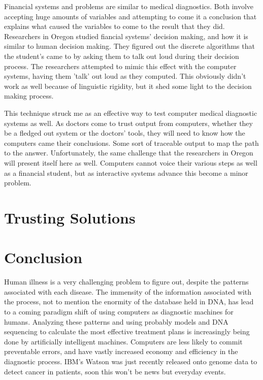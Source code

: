 \documentclass[11pt]{article}
\newcommand{\tab}{\hspace*{2em}}
\begin{document}
\begin{doublespace}
\tab Financial systems and problems are similar to medical diagnostics. Both involve accepting huge amounts of variables and attempting to come it a conclusion that explains what caused the variables to come to the result that they did. Researchers in Oregon studied fiancial systems' decision making, and how it is similar to human decision making. They figured out the discrete algorithms that the student's came to by asking them to talk out loud during their decision process. The researchers attempted to mimic this effect with the computer systems, having them 'talk' out loud as they computed. This obviously didn't work as well because of linguistic rigidity, but it shed some light to the decision making process.

\tab This technique struck me as an effective way to test computer medical diagnostic systems as well. As doctors come to trust output from computers, whether they be a fledged out system or the doctors' tools, they will need to know how the computers came their conclusions. Some sort of traceable output to map the path to the answer. Unfortunately, the same challenge that the researchers in Oregon will present itself here as well. Computers cannot voice their various steps as well as a financial student, but as interactive systems advance this become a minor problem.

\section{Trusting Solutions}



\section{Conclusion}

\tab Human illness is a very challenging problem to figure out, despite the patterns associated with each disease. The
immensity of the information associated with the process, not to mention the enormity of the database held in DNA, has 
lead to a coming paradigm shift of using computers as diagnostic machines for humans. Analyzing these patterns and using
probably models and DNA sequencing to calculate the most effective treatment plans is increasingly being done by 
artificially intelligent machines. Computers are less likely to commit preventable errors, and have vastly increased 
economy and efficiency in the diagnostic process. IBM's Watson was just recently released onto genome data to detect 
cancer in patients, soon this won't be news but everyday events. 

\pagebreak


\end{doublespace}

\nocite{*}



\end{document}
